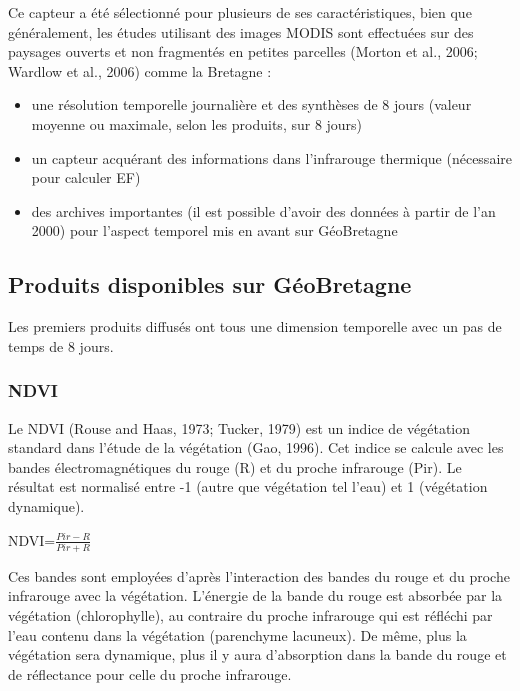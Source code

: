 \documentclass[10pt,a4paper]{article}
\begin{document}
Ce capteur a été sélectionné pour plusieurs de ses caractéristiques, bien que généralement, les études utilisant des images MODIS sont effectuées sur des paysages ouverts et non fragmentés en petites parcelles (Morton et al., 2006; Wardlow et al., 2006) comme la Bretagne :
\begin{itemize}
\item une résolution temporelle journalière et des synthèses de 8 jours (valeur moyenne ou maximale, selon les produits, sur 8 jours)
\item un capteur acquérant des informations dans l'infrarouge thermique (nécessaire pour calculer EF)
\item des archives importantes (il est possible d'avoir des données à partir de l'an 2000) pour l'aspect temporel mis en avant sur GéoBretagne
\end{itemize}

\subsection{Produits disponibles sur GéoBretagne}

Les premiers produits diffusés ont tous une dimension temporelle avec un pas de temps de 8 jours.

\subsubsection{NDVI}

Le NDVI (Rouse and Haas, 1973; Tucker, 1979) est un indice de végétation standard dans l'étude de la végétation (Gao, 1996). Cet indice se calcule avec les bandes électromagnétiques du rouge (R) et du proche infrarouge (Pir). Le résultat est normalisé entre -1 (autre que végétation tel l'eau) et 1 (végétation dynamique).\smallbreak

\begin{center}
\textrm{NDVI}=$ \frac{Pir-R}{Pir+R} $
\end{center}\smallbreak

Ces bandes sont employées d'après l’interaction des bandes du rouge et du proche infrarouge avec la végétation. L'énergie de la bande du rouge est absorbée par la végétation (chlorophylle), au contraire du proche infrarouge qui est réfléchi par l'eau contenu dans la végétation (parenchyme lacuneux). De même, plus la végétation sera dynamique, plus il y aura d'absorption dans la bande du rouge et de réflectance pour celle du proche infrarouge.\smallbreak
\end{document}
